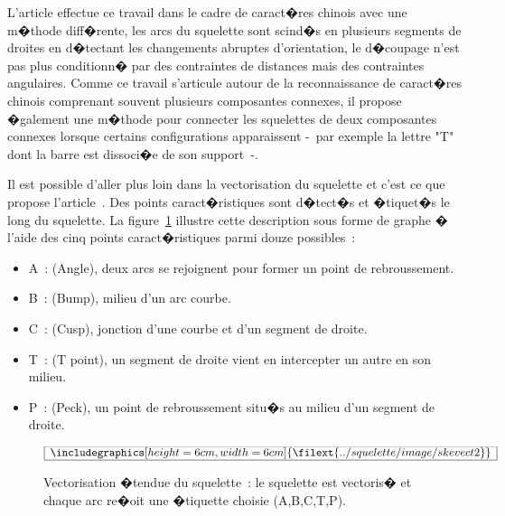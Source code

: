 
L'article  effectue ce travail dans le cadre de caract�res chinois avec une m�thode diff�rente, les arcs du squelette sont scind�s en plusieurs segments de droites en d�tectant les changements abruptes d'orientation, le d�coupage n'est pas plus conditionn� par des contraintes de distances mais des contraintes angulaires. Comme ce travail s'articule autour de la reconnaissance de caract�res chinois comprenant souvent plusieurs composantes connexes, il propose �galement une m�thode pour connecter les squelettes de deux composantes connexes lorsque certains configurations apparaissent -~par exemple la lettre "T" dont la barre est dissoci�e de son support~-.

Il est possible d'aller plus loin dans la vectorisation du squelette et c'est ce que propose l'article~. Des points caract�ristiques sont d�tect�s et �tiquet�s le long du squelette. La figure~\ref{squelette_vector_etendu} illustre cette description sous forme de graphe � l'aide des cinq points caract�ristiques parmi douze possibles~:

        \begin{itemize}
        \item A~: (Angle), deux arcs se rejoignent pour former un point de rebroussement.
        \item B~: (Bump), milieu d'un arc courbe.
        \item C~: (Cusp), jonction d'une courbe et d'un segment de droite.
        \item T~: (T point), un segment de droite vient en intercepter un autre en son milieu.
        \item P~: (Peck), un point de rebroussement situ�s au milieu d'un segment de droite.
        \end{itemize}



            \begin{figure}[ht]
        $$\frame{$\begin{array}[c]{c}\includegraphics[height=6cm, width=6cm]
        {\filext{../squelette/image/skevect2}}\end{array}$}$$
        \caption{    Vectorisation �tendue du squelette~: le squelette est vectoris� et chaque arc
                            re�oit une �tiquette choisie (A,B,C,T,P).}
        \label{squelette_vector_etendu}
            \end{figure}



